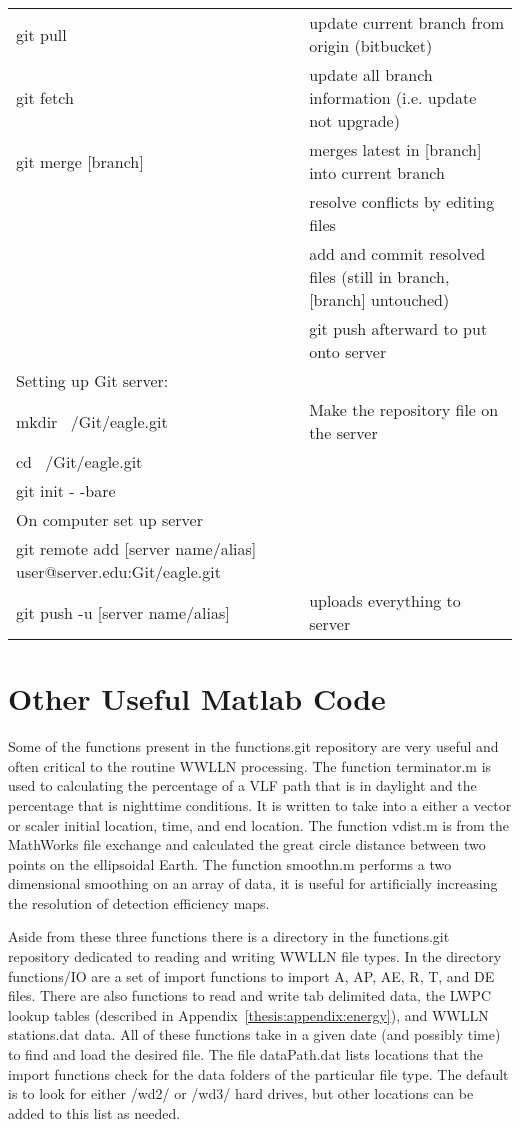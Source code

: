 \begin{landscape}
\begin{center}
\begin{longtable}{|p{4in}|p{4in}|}
git pull & update current branch from origin (bitbucket) \\
git fetch & update all branch information (i.e. update not upgrade) \\
git merge [branch] & merges latest in [branch] into current branch \\
& resolve conflicts by editing files \\
& add and commit resolved files (still in branch, [branch] untouched) \\
& git push afterward to put onto server \\
Setting up Git server: & \\
mkdir ~/Git/eagle.git & Make the repository file on the server \\
cd ~/Git/eagle.git & \\
git init - -bare & \\
On computer set up server & \\
git remote add [server name/alias] user@server.edu:Git/eagle.git & \\
git push -u [server name/alias] & uploads everything to server 
\label{label}
\end{longtable}
\end{center}
\end{landscape}

\section{Other Useful Matlab Code}

Some of the functions present in the functions.git repository are very useful and often critical to the routine WWLLN processing.
The function terminator.m is used to calculating the percentage of a VLF path that is in daylight and the percentage that is nighttime conditions.
It is written to take into a either a vector or scaler initial location, time, and end location.
The function vdist.m is from the MathWorks file exchange and calculated the great circle distance between two points on the ellipsoidal Earth.
The function smoothn.m performs a two dimensional smoothing on an array of data, it is useful for artificially increasing the resolution of detection efficiency maps.

Aside from these three functions there is a directory in the functions.git repository dedicated to reading and writing WWLLN file types.
In the directory functions/IO are a set of import functions to import A, AP, AE, R, T, and DE files.
There are also functions to read and write tab delimited data, the LWPC lookup tables (described in Appendix~\ref{thesis:appendix:energy}), and WWLLN stations.dat data.
All of these functions take in a given date (and possibly time) to find and load the desired file.
The file dataPath.dat lists locations that the import functions check for the data folders of the particular file type.
The default is to look for either /wd2/ or /wd3/ hard drives, but other locations can be added to this list as needed.
